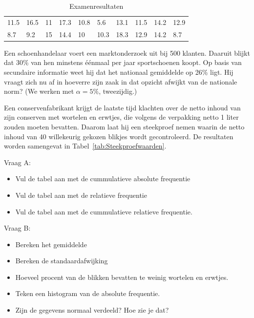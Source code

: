 {\begin{table}
  \centering
  \begin{tabular}{llllllllll}
    11.5 & 16.5 & 11 & 17.3 & 10.8 & 5.6  & 13.1 & 11.5 & 14.2 & 12.9 \\
    8.7  & 9.2  & 15 & 14.4 & 10   & 10.3 & 18.3 & 12.9 & 14.2 & 8.7
  \end{tabular}
  \caption{Examenresultaten}
  \label{tab:examen}
\end{table}

\begin{exercise}
  Een schoenhandelaar voert een marktonderzoek uit bij 500 klanten. Daaruit blijkt dat 30\% van hen minstens éénmaal per jaar sportschoenen koopt.  Op basis van secundaire informatie weet hij dat het nationaal gemiddelde op 26\% ligt.  Hij vraagt zich nu af in hoeverre zijn zaak in dat opzicht afwijkt van de nationale norm? (We werken met $\alpha= 5\%$, tweezijdig.)
\end{exercise}

\begin{exercise}
  Een conservenfabrikant krijgt de laatste tijd klachten over de netto inhoud van zijn conserven met wortelen en erwtjes, die volgens de verpakking netto 1 liter zouden moeten bevatten. Daarom laat hij een steekproef nemen waarin de netto inhoud van 40 willekeurig gekozen blikjes wordt gecontroleerd. De resultaten worden samengevat in Tabel~\ref{tab:Steekproefwaarden}.

Vraag A:
\begin{itemize}
  \item Vul de tabel aan met de cummulatieve absolute frequentie
  \item Vul de tabel aan met de relatieve frequentie
  \item Vul de tabel aan met de cummulatieve relatieve frequentie.
\end{itemize}
Vraag B:

\begin{itemize}
  \item Bereken het gemiddelde
  \item Bereken de standaardafwijking
  \item Hoeveel procent van de blikken bevatten te weinig wortelen en erwtjes.
  \item Teken een histogram van de absolute frequentie.
  \item Zijn de gegevens normaal verdeeld?  Hoe zie je dat?
\end{itemize}

\end{exercise}

}
